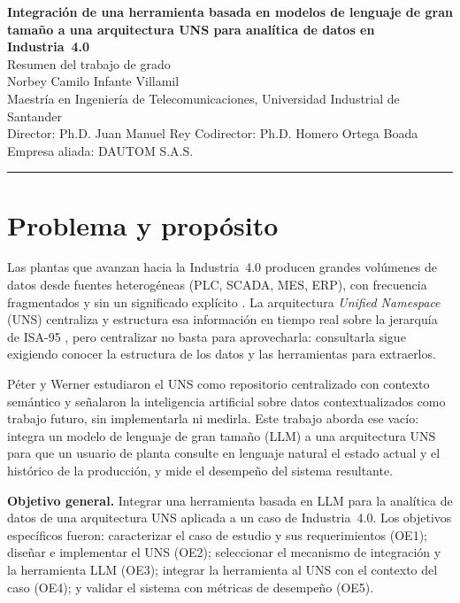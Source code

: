 \documentclass[11pt,letterpaper]{article}
\begin{document}
\begin{center}
{\Large\bfseries\color{gris} Integración de una herramienta basada en modelos de lenguaje de gran tamaño a una arquitectura UNS para analítica de datos en Industria~4.0}\\[6pt]
{\large Resumen del trabajo de grado}\\[8pt]
Norbey Camilo Infante Villamil\\
Maestría en Ingeniería de Telecomunicaciones, Universidad Industrial de Santander\\
Director: Ph.D. Juan Manuel Rey \quad Codirector: Ph.D. Homero Ortega Boada\\
Empresa aliada: DAUTOM S.A.S.\\[2pt]
{\color{turquesa}\rule{0.35\textwidth}{2pt}}
\end{center}

\section{Problema y propósito}

Las plantas que avanzan hacia la Industria~4.0 producen grandes volúmenes de datos desde fuentes heterogéneas (PLC, SCADA, MES, ERP), con frecuencia fragmentados y sin un significado explícito \cite{wef1,scd1}. La arquitectura \textit{Unified Namespace} (UNS) centraliza y estructura esa información en tiempo real sobre la jerarquía de ISA-95 \cite{DiazUNS2025,johnsson2004isa}, pero centralizar no basta para aprovecharla: consultarla sigue exigiendo conocer la estructura de los datos y las herramientas para extraerlos.

Péter y Werner \cite{Thesis2024UNS} estudiaron el UNS como repositorio centralizado con contexto semántico y señalaron la inteligencia artificial sobre datos contextualizados como trabajo futuro, sin implementarla ni medirla. Este trabajo aborda ese vacío: integra un modelo de lenguaje de gran tamaño (LLM) a una arquitectura UNS para que un usuario de planta consulte en lenguaje natural el estado actual y el histórico de la producción, y mide el desempeño del sistema resultante.

\textbf{Objetivo general.} Integrar una herramienta basada en LLM para la analítica de datos de una arquitectura UNS aplicada a un caso de Industria~4.0. Los objetivos específicos fueron: caracterizar el caso de estudio y sus requerimientos (OE1); diseñar e implementar el UNS (OE2); seleccionar el mecanismo de integración y la herramienta LLM (OE3); integrar la herramienta al UNS con el contexto del caso (OE4); y validar el sistema con métricas de desempeño (OE5).
\end{document}
